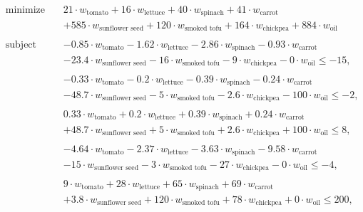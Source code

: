 \documentclass[../main.tex]{subfiles}
\begin{document}
\begin{enumerate}[i.]
	\begin{equation*}
		\begin{aligned}
			& \text{minimize} & & 21 \cdot w_{\text{tomato}} + 16 \cdot  w_{\text{lettuce}} + 40 \cdot w_{\text{spinach}} + 41 \cdot w_{\text{carrot}} \\
			& & & + 585 \cdot w_{\text{sunflower seed}} + 120 \cdot w_{\text{smoked tofu}} + 164 \cdot w_{\text{chickpea}} + 884 \cdot w_{\text{oil}}\\ \\
			& \text{subject to} & & -0.85 \cdot w_{\text{tomato}} - 1.62 \cdot  w_{\text{lettuce}} - 2.86 \cdot w_{\text{spinach}} - 0.93 \cdot w_{\text{carrot}} \\
			& & & - 23.4 \cdot w_{\text{sunflower seed}} - 16 \cdot w_{\text{smoked tofu}} - 9 \cdot w_{\text{chickpea}} - 0 \cdot w_{\text{oil}} \leq -15, \\ \\
			& & & - 0.33 \cdot w_{\text{tomato}} - 0.2 \cdot  w_{\text{lettuce}} - 0.39 \cdot w_{\text{spinach}} - 0.24  \cdot w_{\text{carrot}} \\
			& & & - 48.7 \cdot w_{\text{sunflower seed}} - 5 \cdot w_{\text{smoked tofu}} - 2.6 \cdot w_{\text{chickpea}} - 100 \cdot w_{\text{oil}} \leq -2, \\ \\
			& & & 0.33 \cdot w_{\text{tomato}} + 0.2 \cdot  w_{\text{lettuce}} + 0.39 \cdot w_{\text{spinach}} + 0.24  \cdot w_{\text{carrot}} \\
			& & & + 48.7 \cdot w_{\text{sunflower seed}} + 5 \cdot w_{\text{smoked tofu}} + 2.6 \cdot w_{\text{chickpea}} + 100 \cdot w_{\text{oil}} \leq 8, \\ \\
			& & & - 4.64 \cdot w_{\text{tomato}} - 2.37 \cdot  w_{\text{lettuce}} - 3.63 \cdot w_{\text{spinach}} - 9.58  \cdot w_{\text{carrot}} \\
			& & & - 15 \cdot w_{\text{sunflower seed}} - 3 \cdot w_{\text{smoked tofu}} - 27 \cdot w_{\text{chickpea}} - 0 \cdot w_{\text{oil}} \leq -4, \\ \\
			& & & 9 \cdot w_{\text{tomato}} + 28 \cdot  w_{\text{lettuce}} + 65 \cdot w_{\text{spinach}} + 69  \cdot w_{\text{carrot}} \\
			& & & + 3.8 \cdot w_{\text{sunflower seed}} + 120 \cdot w_{\text{smoked tofu}} + 78 \cdot w_{\text{chickpea}} + 0 \cdot w_{\text{oil}} \leq 200, \\ \\

\end{aligned}
\end{equation*}
\end{enumerate}
\end{document}
